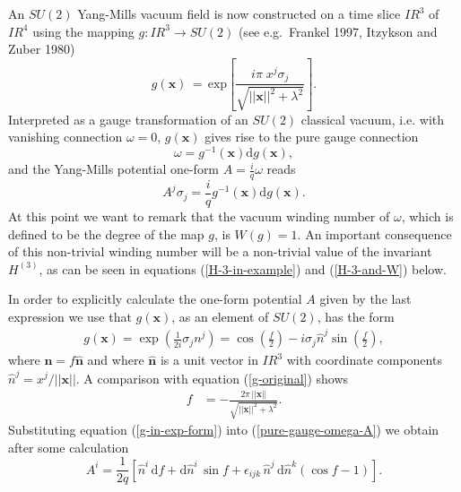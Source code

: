 \documentclass[10pt]{iopart}
\def \d{\mbox{d}}
\def \reals{I\!\!R}
\def \text{\mbox}
\def \Eq{equation }
\def \bx{{\mathbf{x}}}
\def \bn{{\mathbf{n}}}
\def \indi{i}
\def \indj{j}
\def \indk{k}
\begin{document}
An $SU(2)$ Yang-Mills vacuum field 
is now constructed
on a time slice $\reals^3$ of $\reals^4$
using the mapping $g: \reals^3 \rightarrow SU(2)$ (see e.g.~Frankel 1997, Itzykson and Zuber 1980)
\begin{equation}
   g(\bx) \,=\, \text{exp}\left[\frac{i\pi \; x^j \sigma_j}
                          {\sqrt{||\bx||^2 + \lambda^2}}\right].
                        \label{g-original}
\end{equation}
Interpreted as a gauge transformation of an $SU(2)$ classical vacuum,
i.e. with vanishing
connection  $\omega = 0$,
$g(\bx)$ gives rise to the pure gauge connection
\begin{equation}
   \omega = g^{-1}(\bx)\d g(\bx),\label{pure-gauge-omega}
\end{equation}
and the Yang-Mills potential one-form $A = \frac{i}{q}\omega$ reads
\begin{equation}
 A^j \sigma_j = \frac{i}{q}g^{-1}(\bx)\d g(\bx).
         \label{pure-gauge-omega-A} 
\end{equation}
At this point we want to remark that
the vacuum winding number of $\omega$,
which is defined to be the degree of the map $g$,
is $W(g)=1$.
An important consequence of this non-trivial winding number will be a 
non-trivial value of the invariant $H^{(3)}$, as can be seen in
equations (\ref{H-3-in-example}) and (\ref{H-3-and-W}) below.

In order to explicitly calculate the one-form potential $A$ 
given by the last expression we use
that $g(\bx)$, as an element of $SU(2)$, has the form
\begin{eqnarray}
   g(\bx) = \exp\left(\frac{1}{2i}\sigma_j n^j \right)
          = \cos\left({\frac{f}{2}}\right) 
                  -i \sigma_j \hat{n}^j \sin\left({\frac{f}{2}}\right),
                  \label{g-in-exp-form}
\end{eqnarray}
where $\bn = f {\hat\bn}$ 
and where $\hat{\bn}$ is a unit vector in $\reals^3$ with 
coordinate components $\hat{n}^j = x^j/||\bx||$. 
A comparison with \Eq  (\ref{g-original}) shows
\begin{eqnarray}
   f &= - \frac{2 \pi \,||\bx||}{\sqrt{||\bx||^2 + \lambda^2}}. \label{definition-f}
\end{eqnarray}
Substituting \Eq  (\ref{g-in-exp-form}) into (\ref{pure-gauge-omega-A})
we obtain after some calculation
\begin{equation}
   A^\indi =  \frac{1}{2q}\left[
               \hat{n}^\indi\,\d f + \d \hat{n}^\indi \,\sin{f} 
               +
               \epsilon_{\indi\indj\indk}\,\hat{n}^\indj\,\d\hat{n}^\indk 
               (\cos{f}-1)\right]. \label{Yang-Mills-potential-components}
\end{equation}
\end{document}
